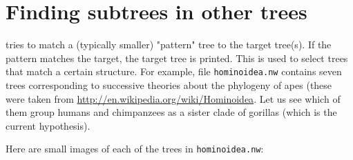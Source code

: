 \section{Finding subtrees in other trees}
\label{sct_match}

\match{} tries to match a (typically smaller) "pattern" tree to the target
tree(s). If the pattern matches the target, the target tree is printed. This is
used to select trees that match a certain structure. For example, file
\texttt{hominoidea.nw} contains seven trees corresponding to successive
theories about the phylogeny of apes (these were taken from
\url{http://en.wikipedia.org/wiki/Hominoidea}. Let us see which of them group
humans and chimpanzees as a sister clade of gorillas (which is the current
hypothesis).

\begin{samepage}
Here are small images of each of the trees in \texttt{hominoidea.nw}: \\


\end{samepage}
